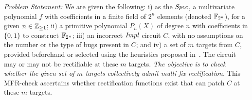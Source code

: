 


{\it Problem Statement:}
We are given the following: i) as the ${\it Spec}$, a multivariate
polynomial $f$ with coefficients in a finite field of $2^n$ elements
(denoted ${\mathbb{F}}_{2^n}$), for a given  $n\in {\mathbb{Z}}_{\geq 1}$; ii) a primitive
polynomial $P_n(X)$ of degree $n$ with coefficients in $\{0,1\}$
to construct ${\mathbb{F}}_{2^n}$; iii) an incorrect ${\it Impl}$ circuit $C$,
with no assumptions on the number or the type of bugs present in
$C$; and
iv) a set of $m$ targets from $C$, provided beforehand or selected using the heuristics 
proposed in~\cite{SS_Alan:DAC18,SS_Fujita:ISCAS19,SS_Roland:DAC19}.
The circuit may or may not be rectifiable at these $m$ targets.
{\it The objective is to check whether the given set of $m$
  targets collectively admit multi-fix rectification.} 
 This MFR-check ascertains whether rectification functions exist that can
patch $C$ at these $m$-targets. 

